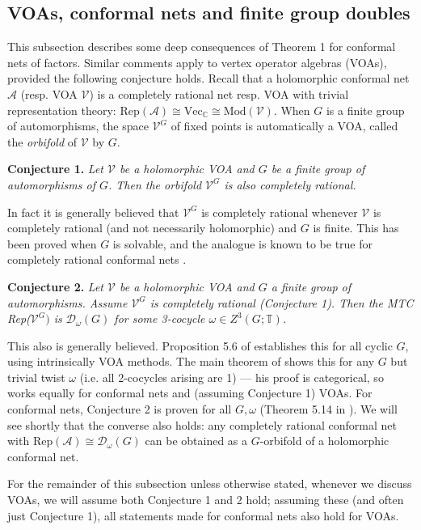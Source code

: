 \documentclass[12pt]{article}
\numberwithin{equation}{section}
\def\cA            {{\mathcal{A}}}
\def\cD            {{\mathcal{D}}}
\def\cV            {{\mathcal{V}}}
\def\bbC           {\mathbb{C}}
\def\bbT           {\mathbb{T}}
\begin{document}
\subsection{{VOAs, conformal nets and finite group doubles}} 

This subsection describes some deep consequences of Theorem 1  for conformal nets of factors. Similar comments apply to  vertex operator algebras (VOAs), provided the following conjecture holds. Recall that a holomorphic conformal net $\cA$ (resp. VOA $\cV$) is a completely rational net resp. VOA with trivial representation theory: Rep$(\cA)\cong \mathrm{Vec}_{\bbC}\cong\mathrm{Mod}(\cV)$. When $G$ is a finite group of automorphisms, the space $\cV^G$ of fixed points is automatically a VOA, called the \textit{orbifold} of $\cV$ by $G$.

\medskip\noindent\textbf{Conjecture 1.} \textit{Let $\cV$ be a holomorphic VOA and $G$ be a finite group of
automorphisms of $G$. Then the orbifold $\cV^G$ is also completely rational.}\medskip

In fact it is generally believed that $\cV^G$ is completely rational whenever $\cV$ is completely rational (and not necessarily holomorphic) and $G$ is finite. This has been proved \cite{Miy,CM} when $G$ is solvable, and the analogue is known to be true for completely rational conformal nets \cite{Xu}. 

\medskip\noindent\textbf{Conjecture 2.} \textit{Let $\cV$ be a holomorphic VOA and $G$ a finite group of automorphisms. Assume $\cV^G$ is completely rational (Conjecture 1). Then
the MTC Rep($\cV^G)$ is $\cD_\omega(G)$ for some
3-cocycle $\omega\in Z^3(G;\bbT)$.}\medskip

This also is generally believed. Proposition 5.6 of \cite{DRX} establishes this for all cyclic $G$, using
intrinsically VOA methods. The main theorem of \cite{Kir} shows this for any $G$ but trivial
twist $\omega$  (i.e. all 2-cocycles arising are 1) --- his proof is categorical, so works equally
for conformal nets and (assuming Conjecture 1) VOAs. For conformal nets, Conjecture
2 is proven for all $G,\omega$ (Theorem 5.14 in \cite{Mug}). We will see shortly that the converse also holds: any completely rational conformal net with Rep$(\cA)\cong\cD_\omega(G)$ can be obtained as a $G$-orbifold of a holomorphic conformal net.
 


For the remainder of this subsection unless otherwise stated, whenever we discuss VOAs, we will assume both Conjecture 1 and 2 hold; assuming these (and often just Conjecture 1), all statements made for conformal nets also hold for
VOAs. 
 
\end{document}
